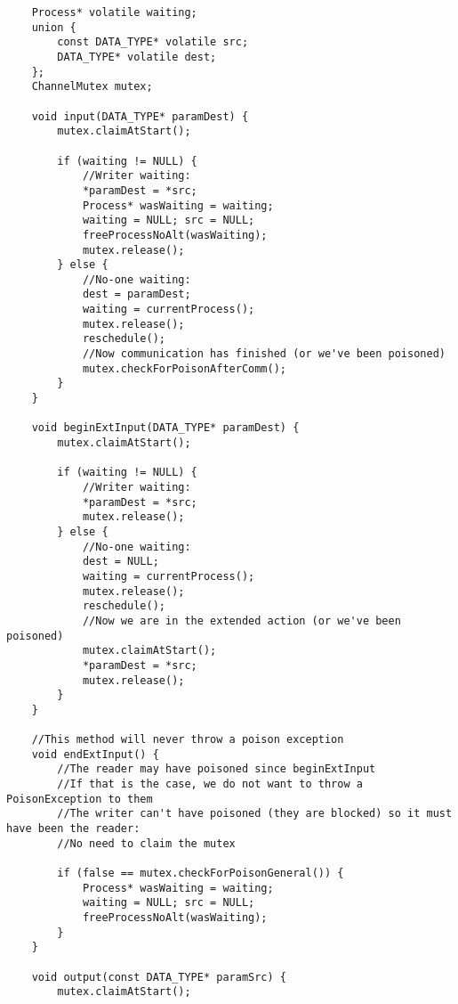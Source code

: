 \documentclass{article}
\begin{document}
{\small\begin{verbatim}
    Process* volatile waiting;
    union {
        const DATA_TYPE* volatile src;
        DATA_TYPE* volatile dest;
    };
    ChannelMutex mutex;

    void input(DATA_TYPE* paramDest) {
        mutex.claimAtStart();

        if (waiting != NULL) {
            //Writer waiting:
            *paramDest = *src;
            Process* wasWaiting = waiting;
            waiting = NULL; src = NULL;
            freeProcessNoAlt(wasWaiting);
            mutex.release();
        } else {
            //No-one waiting:
            dest = paramDest;
            waiting = currentProcess();
            mutex.release();
            reschedule();
            //Now communication has finished (or we've been poisoned)
            mutex.checkForPoisonAfterComm();
        }
    }

    void beginExtInput(DATA_TYPE* paramDest) {
        mutex.claimAtStart();

        if (waiting != NULL) {
            //Writer waiting:
            *paramDest = *src;
            mutex.release();
        } else {
            //No-one waiting:
            dest = NULL;
            waiting = currentProcess();
            mutex.release();
            reschedule();
            //Now we are in the extended action (or we've been poisoned)
            mutex.claimAtStart();
            *paramDest = *src;
            mutex.release();
        }
    }

    //This method will never throw a poison exception
    void endExtInput() {
        //The reader may have poisoned since beginExtInput
        //If that is the case, we do not want to throw a PoisonException to them
        //The writer can't have poisoned (they are blocked) so it must have been the reader:
        //No need to claim the mutex

        if (false == mutex.checkForPoisonGeneral()) {
            Process* wasWaiting = waiting;
            waiting = NULL; src = NULL;
            freeProcessNoAlt(wasWaiting);
        }
    }

    void output(const DATA_TYPE* paramSrc) {
        mutex.claimAtStart();


\end{verbatim}}
\end{document}
